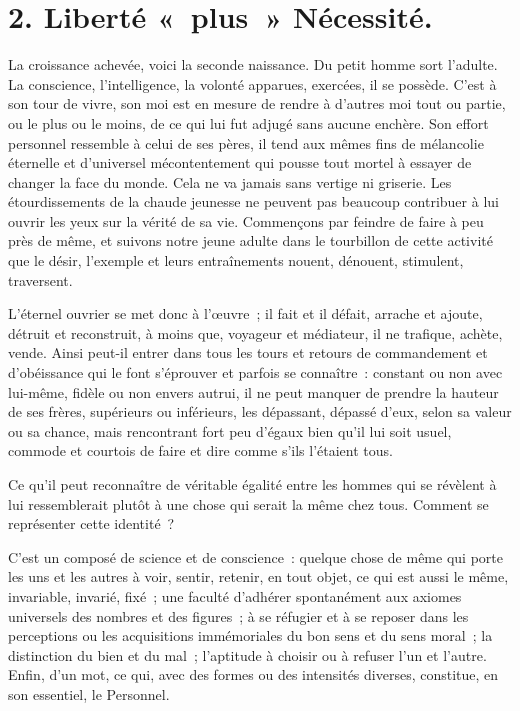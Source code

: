\documentclass[french,twoside]{book} %
\begin{document}
\section[{2. Liberté « plus » Nécessité.}]{2. Liberté « plus » Nécessité.}
\noindent La croissance achevée, voici la seconde naissance. Du petit homme sort l’adulte. La conscience, l’intelligence, la volonté apparues, exercées, il se possède. C’est à son tour de vivre, son moi est en mesure de rendre à d’autres moi tout ou partie, ou le plus ou le moins, de ce qui lui fut adjugé sans aucune enchère. Son effort personnel ressemble à celui de ses pères, il tend aux mêmes fins de mélancolie éternelle et d’universel mécontentement qui pousse tout mortel à essayer de changer la face du monde. Cela ne va jamais sans vertige ni griserie. Les étourdissements de la chaude jeunesse ne peuvent pas beaucoup contribuer à lui ouvrir les yeux sur la vérité de sa vie. Commençons par feindre de faire à peu près de même, et suivons notre jeune adulte dans le tourbillon de cette activité que le désir, l’exemple et leurs entraînements nouent, dénouent, stimulent, traversent.\par
L’éternel ouvrier se met donc à l’œuvre ; il fait et il défait, arrache et ajoute, détruit et reconstruit, à moins que, voyageur et médiateur, il ne trafique, achète, vende. Ainsi peut-il entrer dans tous les tours et retours de commandement et d’obéissance qui le font s’éprouver et parfois se connaître : constant ou non avec lui-même, fidèle ou non envers autrui, il ne peut manquer de prendre la hauteur de ses frères, supérieurs ou inférieurs, les dépassant, dépassé d’eux, selon sa valeur ou sa chance, mais rencontrant fort peu d’égaux bien qu’il lui soit usuel, commode et courtois de faire et dire comme s’ils l’étaient tous.\par
Ce qu’il peut reconnaître de véritable égalité entre les hommes qui se révèlent à lui ressemblerait plutôt à une chose qui serait la même chez tous. Comment se représenter cette identité ?\par
C’est un composé de science et de conscience : quelque chose de même qui porte les uns et les autres à voir, sentir, retenir, en tout objet, ce qui est aussi le même, invariable, invarié, fixé ; une faculté d’adhérer spontanément aux axiomes universels des nombres et des figures ; à se réfugier et à se reposer dans les perceptions ou les acquisitions immémoriales du bon sens et du sens moral ; la distinction du bien et du mal ; l’aptitude à choisir ou à refuser l’un et l’autre. Enfin, d’un mot, ce qui, avec des formes ou des intensités diverses, constitue, en son essentiel, le Personnel.\par
\end{document}
